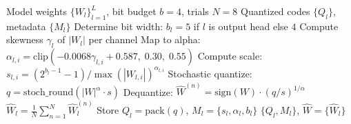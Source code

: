 \begin{algorithm}[h]
\caption{CCCP: Complete Quantization Pipeline}
\label{alg:cccp}
\begin{algorithmic}[1]
\REQUIRE Model weights $\{W_l\}_{l=1}^L$, bit budget $b=4$, trials $N=8$
\ENSURE Quantized codes $\{Q_l\}$, metadata $\{M_l\}$
    \STATE Determine bit width: $b_l = 5$ if $l$ is output head else $4$
    \STATE Compute skewness $\gamma_l$ of $|W_l|$ per channel
    \STATE Map to alpha: $\alpha_{l,i} = \text{clip}(-0.0068\gamma_{l,i} + 0.587,\; 0.30,\; 0.55)$
    \STATE Compute scale: $s_{l,i} = (2^{b_l-1}-1) / \max(|W_{l,i}|)^{\alpha_{l,i}}$
        \STATE Stochastic quantize: $q = \text{stoch\_round}(|W|^{\alpha} \cdot s)$
        \STATE Dequantize: $\hat{W}^{(n)} = \text{sign}(W) \cdot (q/s)^{1/\alpha}$
    \ENDFOR
    \STATE $\hat{W}_l = \frac{1}{N}\sum_{n=1}^{N} \hat{W}_l^{(n)}$
    \STATE Store $Q_l = \text{pack}(q)$, $M_l = \{s_l, \alpha_l, b_l\}$
\ENDFOR
\RETURN $\{Q_l, M_l\}$, $\hat{W} = \{\hat{W}_l\}$
\end{algorithmic}
\end{algorithm}
